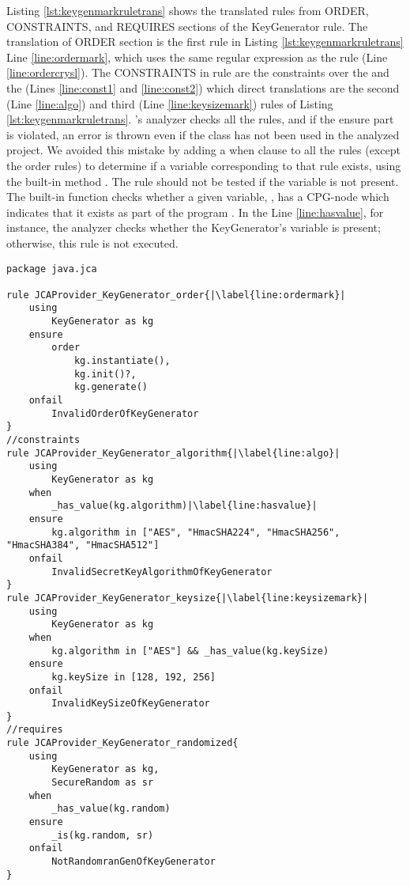 Listing \ref{lst:keygenmarkruletrans} shows the translated rules from ORDER, CONSTRAINTS, and REQUIRES sections of the KeyGenerator \crysl{} rule. The translation of \crysl{} ORDER section is the first rule in Listing \ref{lst:keygenmarkruletrans} Line \ref{line:ordermark}, which uses the same regular expression as the \crysl{} rule (Line \ref{line:ordercrysl}). The CONSTRAINTS in \crysl{} rule are the constraints over the  and the  (Lines \ref{line:const1} and \ref{line:const2}) which direct translations are the second (Line \ref{line:algo}) and third (Line \ref{line:keysizemark}) rules of Listing \ref{lst:keygenmarkruletrans}. \MARK's analyzer checks all the rules, and if the ensure part is violated, an error is thrown even if the class has not been used in the analyzed project. We avoided this mistake by adding a when clause to all the \MARK{} rules (except the order rules) to determine if a variable corresponding to that rule exists, using the built-in method . The rule should not be tested if the variable is not present. The built-in function  checks whether a given \MARK{} variable, , has a CPG-node which indicates that it exists as part of the program \cite{codyzegit}. In the Line \ref{line:hasvalue}, for instance, the analyzer checks whether the KeyGenerator's  variable is present; otherwise, this rule is not executed.
 \pagebreak
\begin{lstlisting}[language=MARK2,caption= {Rule part of translated KeyGenerator \crysl{} rule to \MARK{} from JCA API.}, label={lst:keygenmarkruletrans}, escapechar=|]
package java.jca

rule JCAProvider_KeyGenerator_order{|\label{line:ordermark}|
	using
		KeyGenerator as kg
	ensure
		order
			kg.instantiate(),
			kg.init()?,
			kg.generate()
	onfail
		InvalidOrderOfKeyGenerator
}
//constraints
rule JCAProvider_KeyGenerator_algorithm{|\label{line:algo}|
	using
		KeyGenerator as kg
	when 
		_has_value(kg.algorithm)|\label{line:hasvalue}|
	ensure
		kg.algorithm in ["AES", "HmacSHA224", "HmacSHA256", "HmacSHA384", "HmacSHA512"]
	onfail
		InvalidSecretKeyAlgorithmOfKeyGenerator
}
rule JCAProvider_KeyGenerator_keysize{|\label{line:keysizemark}|
	using
		KeyGenerator as kg
	when
		kg.algorithm in ["AES"] && _has_value(kg.keySize)
	ensure
		kg.keySize in [128, 192, 256]
	onfail
		InvalidKeySizeOfKeyGenerator
}
//requires
rule JCAProvider_KeyGenerator_randomized{
	using
		KeyGenerator as kg,
		SecureRandom as sr
	when
		_has_value(kg.random)
	ensure
		_is(kg.random, sr)
	onfail
		NotRandomranGenOfKeyGenerator
}
\end{lstlisting}

